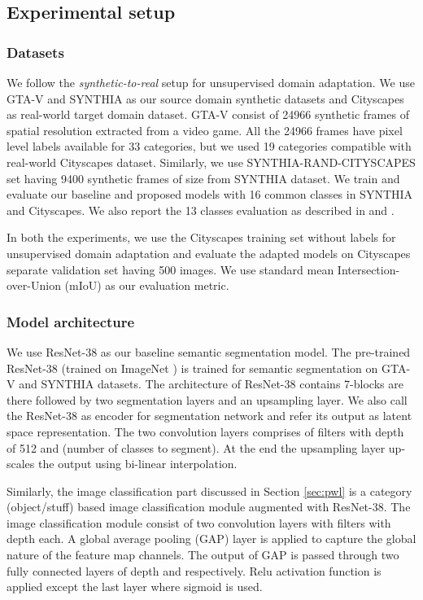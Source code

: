 \documentclass[10pt,twocolumn,letterpaper]{article}
\begin{document}
\subsection{Experimental setup}
\subsubsection{Datasets}
We follow the \textit{synthetic-to-real} setup for unsupervised domain adaptation. We use GTA-V \cite{Richter_2016_ECCV} and SYNTHIA \cite{Ros_2016_CVPR} as our source domain synthetic datasets and Cityscapes \cite{Cordts2016Cityscapes} as real-world target domain dataset. 
GTA-V consist of 24966 synthetic frames of spatial resolution  extracted from a video game. All the 24966 frames have pixel level labels available for 33 categories, but we used 19 categories compatible with real-world Cityscapes dataset. 
Similarly, we use SYNTHIA-RAND-CITYSCAPES set having 9400 synthetic frames of size  from SYNTHIA dataset. We train and evaluate our baseline and proposed models with 16 common classes in SYNTHIA and Cityscapes. We also report the 13 classes evaluation as described in \cite{vu2019advent} and \cite{zou2018unsupervised}.

In both the experiments, we use the Cityscapes training set without labels for unsupervised domain adaptation and evaluate the adapted models on Cityscapes separate validation set having 500 images. We use standard mean Intersection-over-Union (mIoU) as our evaluation metric.
\vspace{-0.2cm}
\subsubsection{Model architecture}
\vspace{-0.1cm}

We use ResNet-38 \cite{wu2019Resnet38} as our baseline semantic segmentation model. The pre-trained ResNet-38 (trained on ImageNet \cite{russakovsky2015imagenet}) is trained for semantic segmentation on GTA-V and SYNTHIA datasets. 
The architecture of ResNet-38 contains 7-blocks are there followed by two segmentation layers and an upsampling layer. We also call the ResNet-38 as encoder for segmentation network and refer its output as latent space representation. The two convolution layers comprises of  filters with depth of 512 and  (number of classes to segment). At the end the upsampling layer up-scales the output using bi-linear interpolation. 

Similarly, the image classification part discussed in Section \ref{sec:pwl} is a category (object/stuff) based image classification module augmented with ResNet-38. The image classification module consist of two convolution layers with filters  with depth  each. A global average pooling (GAP) layer is applied to capture the global nature of the feature map channels. The output of GAP is passed through two fully connected layers of depth  and  respectively. Relu activation function is applied except the last layer where sigmoid is used. 
\vspace{-0.4cm}
\end{document}
